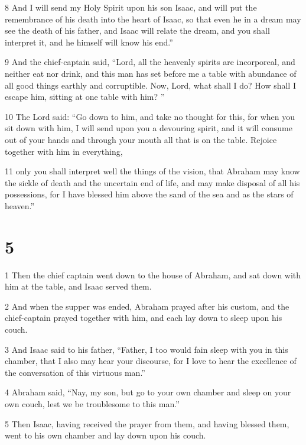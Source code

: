 \par 8 And I will send my Holy Spirit upon his son Isaac, and will put the remembrance of his death into the heart of Isaac, so that even he in a dream may see the death of his father, and Isaac will relate the dream, and you shall interpret it, and he himself will know his end.” 

\par 9 And the chief-captain said, “Lord, all the heavenly spirits are incorporeal, and neither eat nor drink, and this man has set before me a table with abundance of all good things earthly and corruptible. Now, Lord, what shall I do? How shall I escape him, sitting at one table with him? ”

\par 10 The Lord said: “Go down to him, and take no thought for this, for when you sit down with him, I will send upon you a devouring spirit, and it will consume out of your hands and through your mouth all that is on the table. Rejoice together with him in everything, 

\par 11 only you shall interpret well the things of the vision, that Abraham may know the sickle of death and the uncertain end of life, and may make disposal of all his possessions, for I have blessed him above the sand of the sea and as the stars of heaven.”

\chapter{5}

\par 1 Then the chief captain went down to the house of Abraham, and sat down with him at the table, and Isaac served them. 

\par 2 And when the supper was ended, Abraham prayed after his custom, and the chief-captain prayed together with him, and each lay down to sleep upon his couch. 

\par 3 And Isaac said to his father, “Father, I too would fain sleep with you in this chamber, that I also may hear your discourse, for I love to hear the excellence of the conversation of this virtuous man.” 

\par 4 Abraham said, “Nay, my son, but go to your own chamber and sleep on your own couch, lest we be troublesome to this man.” 

\par 5 Then Isaac, having received the prayer from them, and having blessed them, went to his own chamber and lay down upon his couch. 

